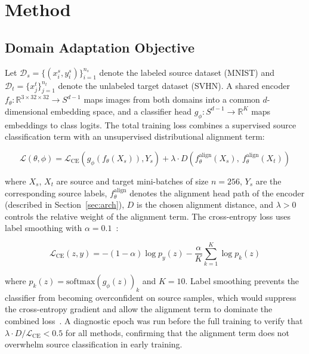 \documentclass{article}
\begin{document}
	
	
	
	
	\section{Method}
	
	\subsection{Domain Adaptation Objective}
	
	Let $\mathcal{D}_s = \{(x_i^s, y_i^s)\}_{i=1}^{n_s}$ denote the labeled source dataset (MNIST) and $\mathcal{D}_t = \{x_j^t\}_{j=1}^{n_t}$ denote the unlabeled target dataset (SVHN). A shared encoder $f_\theta : \mathbb{R}^{3 \times 32 \times 32} \to S^{d-1}$ maps images from both domains into a common $d$-dimensional embedding space, and a classifier head $g_\phi : S^{d-1} \to \mathbb{R}^K$ maps embeddings to class logits. The total training loss combines a supervised source classification term with an unsupervised distributional alignment term:
	
	\begin{equation}
		\mathcal{L}(\theta, \phi) = \mathcal{L}_{\mathrm{CE}}\!\left(g_\phi(f_\theta(X_s)), 
		Y_s\right) + \lambda \cdot D\!\left(f_\theta^{\mathrm{align}}(X_s),\ 
		f_\theta^{\mathrm{align}}(X_t)\right)
		\label{eq:total_loss}
	\end{equation}
	
	where $X_s$, $X_t$ are source and target mini-batches of size $n = 256$, $Y_s$ are the corresponding source labels, $f_\theta^{\mathrm{align}}$ denotes the alignment head path of the encoder (described in Section~\ref{sec:arch}), $D$ is the chosen alignment distance, and $\lambda > 0$ controls the relative weight of the alignment term. The cross-entropy loss uses label smoothing with $\alpha = 0.1$~\citep{christian}:
	
	\begin{equation}
		\mathcal{L}_{\mathrm{CE}}(z, y) = -(1 - \alpha) \log p_y(z) 
		- \frac{\alpha}{K} \sum_{k=1}^{K} \log p_k(z)
		\label{eq:label_smoothing}
	\end{equation}
	
	where $p_k(z) = \mathrm{softmax}(g_\phi(z))_k$ and $K = 10$. Label smoothing prevents the classifier from becoming overconfident on source samples, which would suppress the cross-entropy gradient and allow the alignment term to dominate the combined loss~\citep{christian}. A diagnostic epoch was run before the full training to verify that $\lambda \cdot D / \mathcal{L}_{\mathrm{CE}} < 0.5$ for all methods, confirming that the alignment term does not overwhelm source classification in early training.
	
\end{document}

